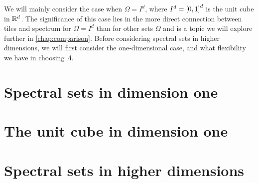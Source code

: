 \documentclass[../thesis.tex]{subfiles}
\begin{document}
We will mainly consider the case when $\Omega=I^d$, where $I^d=\left[0,1\right]^d$ is the unit cube in $\mathbb{R}^d$. The significance of this case lies in the more direct connection between tiles and spectrum for $\Omega=I^d$ than for other sets $\Omega$ and is a topic we will explore further in \cref{chap:comparison}.
Before considering spectral sets in higher dimensions, we will first consider the one-dimensional case, and what flexibility we have in choosing $\Lambda$. 

\section{Spectral sets in dimension one}\label{sec:complx_trig_1d}
\section{The unit cube in dimension one}%
    





\section{Spectral sets in higher dimensions}
    
\end{document}
